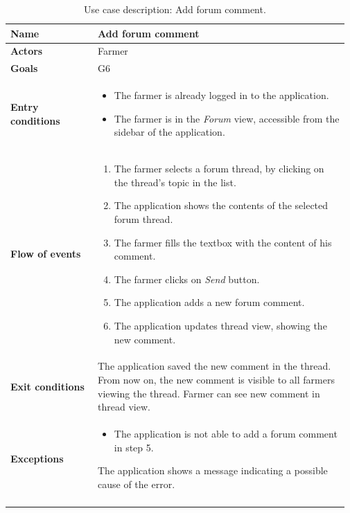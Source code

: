 \begin{longtable}{@{}p{0.25\linewidth} p{0.72\linewidth}@{}}
\toprule
	\textbf{Name}               & Add forum comment \\
	\midrule
	\textbf{Actors}             & Farmer\\
	\midrule
	\textbf{Goals}              & G6 \\
	\midrule
	
	\textbf{Entry conditions}   & \begin{itemize}[leftmargin=.4cm,noitemsep,topsep=0pt,before=\vspace{-3mm},after=\vspace{-4mm}]
	    \item The farmer is already logged in to the application.
	    \item The farmer is in the \textit{Forum} view, accessible from the sidebar of the application.
	\end{itemize}\\
	\midrule
	
	\textbf{Flow of events}     & \begin{enumerate}[leftmargin=.4cm,noitemsep,topsep=0pt,before=\vspace{-3mm},after=\vspace{-4mm}]
	    \item The farmer selects a forum thread, by clicking on the thread's topic in the list.
	    \item The application shows the contents of the selected forum thread.
	    \item The farmer fills the textbox with the content of his comment.
	    \item The farmer clicks on \textit{Send} button.
	    \item The application adds a new forum comment.
	    \item The application updates thread view, showing the new comment.
	\end{enumerate}\\
	\midrule
	\textbf{Exit conditions} & The application saved the new comment in the thread. From now on, the new comment is visible to all farmers viewing the thread. Farmer can see new comment in thread view. \\
	\midrule
	
	\textbf{Exceptions}         &
    \begin{itemize}[leftmargin=.4cm,noitemsep,topsep=0pt]
	   \item The application is not able to add a forum comment in step 5. 
	\end{itemize}
	The application shows a message indicating a possible cause of the error.
	\\\bottomrule
	\caption{Use case description: Add forum comment.} 
\end{longtable}

